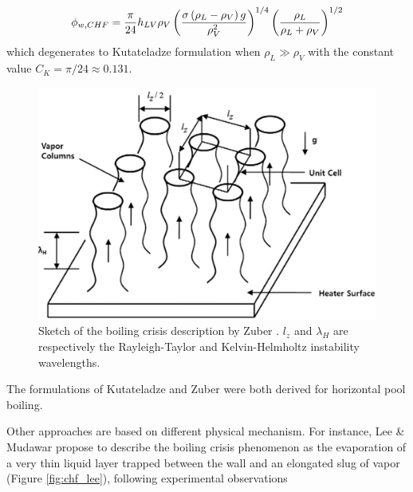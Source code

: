 \begin{equation}
\phi_{w,CHF} = \frac{\pi}{24} h_{LV} \rho_{V} \left( \frac{\sigma \left( \rho_{L} - \rho_{V} \right)g}{\rho_{V}^{2}} \right)^{1/4} \left(  \dfrac{\rho_{L} }{\rho_{L} + \rho_{V}}  \right)^{1/2}
\label{eq:chf_zuber}
\end{equation} 
which degenerates to Kutateladze formulation when $\rho_{L} \gg \rho_{V}$ with the constant value $C_{K} = \pi / 24 \approx 0.131$.

\begin{figure}[!h]
\centering
\includegraphics[width=0.6\linewidth]{img/chf/chf_zuber.png}
\caption{Sketch of the boiling crisis description by Zuber \cite{zuber_hydrodynamic_1959}. $l_{z}$ and $\lambda_{H}$ are respectively the Rayleigh-Taylor and Kelvin-Helmholtz instability wavelengths.}
\label{fig:chf_zuber}
\end{figure}


\begin{note*}{}
The formulations of Kutateladze and Zuber were both derived for horizontal pool boiling.
\end{note*}

\npar


Other approaches are based on different physical mechanism. For instance, Lee \& Mudawar \cite{lee_mechanistic_1988} propose to describe the boiling crisis phenomenon as the evaporation of a very thin liquid layer trapped between the wall and an elongated slug of vapor (Figure \ref{fig:chf_lee}), following experimental observations %


